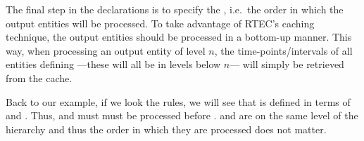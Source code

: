 
The final step in the declarations is to specify the , i.e.~the order in which the output entities will be processed. To take advantage of RTEC's caching technique, the output entities should be processed in a bottom-up manner. This way, when processing an output entity  of level $n$, the time-points/intervals of all entities defining ---these will all be in levels below $n$--- will simply be retrieved from the cache. 

Back to our example, if we look the rules, we will see that  is defined in terms of  and . Thus,  and  must must be processed before .  and  are on the same level of the hierarchy and thus the order in which they are processed does not matter.
